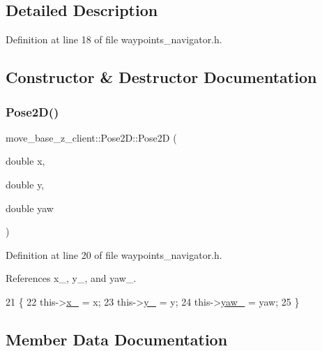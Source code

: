 \subsection{Detailed Description}


Definition at line 18 of file waypoints\+\_\+navigator.\+h.



\subsection{Constructor \& Destructor Documentation}
\mbox{\label{structmove__base__z__client_1_1Pose2D_a97f60b5516b80f09472f178afd07b7ab}} 
\subsubsection{\texorpdfstring{Pose2\+D()}{Pose2D()}}
{\footnotesize\ttfamily move\+\_\+base\+\_\+z\+\_\+client\+::\+Pose2\+D\+::\+Pose2D (\begin{DoxyParamCaption}\item[{double}]{x,  }\item[{double}]{y,  }\item[{double}]{yaw }\end{DoxyParamCaption})\hspace{0.3cm}{\ttfamily [inline]}}



Definition at line 20 of file waypoints\+\_\+navigator.\+h.



References x\+\_\+, y\+\_\+, and yaw\+\_\+.


\begin{DoxyCode}
21   \{
22     this->\hyperlink{structmove__base__z__client_1_1Pose2D_a92b53110c2fdd77c18275d6e16709581}{x\_} = x;
23     this->\hyperlink{structmove__base__z__client_1_1Pose2D_a10e59f372c758bffb00bfaaca43ec1fc}{y\_} = y;
24     this->\hyperlink{structmove__base__z__client_1_1Pose2D_a75fda2f20515d0acdb83d33017e6c97e}{yaw\_} = yaw;
25   \}
\end{DoxyCode}


\subsection{Member Data Documentation}
\mbox{\label{structmove__base__z__client_1_1Pose2D_a92b53110c2fdd77c18275d6e16709581}} 
